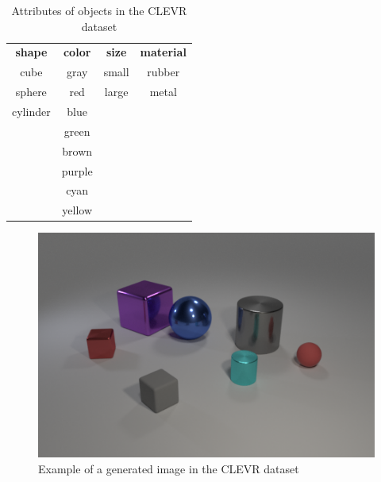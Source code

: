 \begin{table}[h]
    \centering
    \begin{tabular}{cccc}
        \toprule
        \textbf{ shape } & \textbf{ color } & \textbf{ size } & \textbf{ material } \\
        cube             & gray             & small           & rubber              \\
        sphere           & red              & large           & metal               \\
        cylinder         & blue                                                     \\
                         & green                                                    \\
                         & brown                                                    \\
                         & purple                                                   \\
                         & cyan                                                     \\
                         & yellow                                                   \\
        \bottomrule
    \end{tabular}
    \caption{Attributes of objects in the CLEVR dataset}
    \label{tab:clevr-attributes}
\end{table}

\begin{figure}[h]
    \centering
    \includegraphics[width=.8\linewidth]{figures/CLEVR_example.png}
    \caption{Example of a generated image in the CLEVR dataset}
    \label{fig:clevr-example}
\end{figure}

